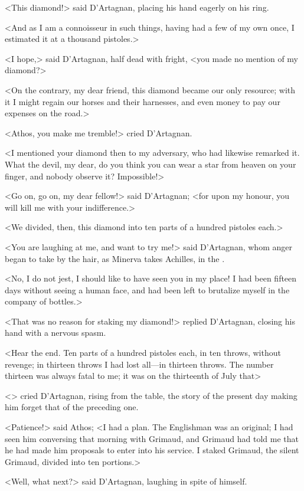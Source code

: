 <This diamond!> said D'Artagnan, placing his hand eagerly on his ring. 

<And as I am a connoisseur in such things, having had a few of my own once, I estimated it at a thousand pistoles.> 

<I hope,> said D'Artagnan, half dead with fright, <you made no mention of my diamond?> 

<On the contrary, my dear friend, this diamond became our only resource; with it I might regain our horses and their harnesses, and even money to pay our expenses on the road.> 

<Athos, you make me tremble!> cried D'Artagnan. 

<I mentioned your diamond then to my adversary, who had likewise remarked it. What the devil, my dear, do you think you can wear a star from heaven on your finger, and nobody observe it? Impossible!> 

<Go on, go on, my dear fellow!> said D'Artagnan; <for upon my honour, you will kill me with your indifference.> 

<We divided, then, this diamond into ten parts of a hundred pistoles each.> 

<You are laughing at me, and want to try me!> said D'Artagnan, whom anger began to take by the hair, as Minerva takes Achilles, in the . 

<No, I do not jest,  I should like to have seen you in my place! I had been fifteen days without seeing a human face, and had been left to brutalize myself in the company of bottles.> 

<That was no reason for staking my diamond!> replied D'Artagnan, closing his hand with a nervous spasm. 

<Hear the end. Ten parts of a hundred pistoles each, in ten throws, without revenge; in thirteen throws I had lost all—in thirteen throws. The number thirteen was always fatal to me; it was on the thirteenth of July that\longdash> 

<> cried D'Artagnan, rising from the table, the story of the present day making him forget that of the preceding one. 

<Patience!> said Athos; <I had a plan. The Englishman was an original; I had seen him conversing that morning with Grimaud, and Grimaud had told me that he had made him proposals to enter into his service. I staked Grimaud, the silent Grimaud, divided into ten portions.> 

<Well, what next?> said D'Artagnan, laughing in spite of himself. 

